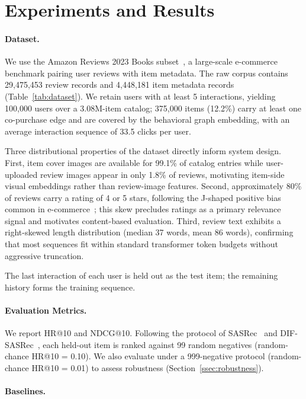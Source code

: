 \section{Experiments and Results}
\label{sec:exp}
\label{sec:results}

\paragraph{Dataset.}
We use the Amazon Reviews 2023 Books subset~\cite{hou2024amazon}, a large-scale
e-commerce benchmark pairing user reviews with item metadata.
The raw corpus contains 29,475,453 review records and 4,448,181 item metadata
records (Table~\ref{tab:dataset}).
We retain users with at least 5 interactions, yielding 100,000 users over a
3.08M-item catalog; 375,000 items (12.2\%) carry at least one co-purchase edge
and are covered by the behavioral graph embedding, with an average interaction
sequence of 33.5 clicks per user.



Three distributional properties of the dataset directly inform system design.
First, item cover images are available for 99.1\% of catalog entries while
user-uploaded review images appear in only 1.8\% of reviews, motivating
item-side visual embeddings rather than review-image features.
Second, approximately 80\% of reviews carry a rating of 4 or 5 stars,
following the J-shaped positive bias common in e-commerce~\cite{hou2024amazon};
this skew precludes ratings as a primary relevance signal and motivates
content-based evaluation.
Third, review text exhibits a right-skewed length distribution (median 37 words,
mean 86 words), confirming that most sequences fit within standard transformer
token budgets without aggressive truncation.

The last interaction of each user is held out as the test item; the remaining
history forms the training sequence.

\paragraph{Evaluation Metrics.}
We report HR@10 and NDCG@10.
Following the protocol of SASRec~\cite{kang2018self} and
DIF-SASRec~\cite{xie2022difsr}, each held-out item is ranked against 99 random
negatives (random-chance HR@10 = 0.10).
We also evaluate under a 999-negative protocol (random-chance HR@10 = 0.01)
to assess robustness (Section~\ref{ssec:robustness}).

\paragraph{Baselines.}


